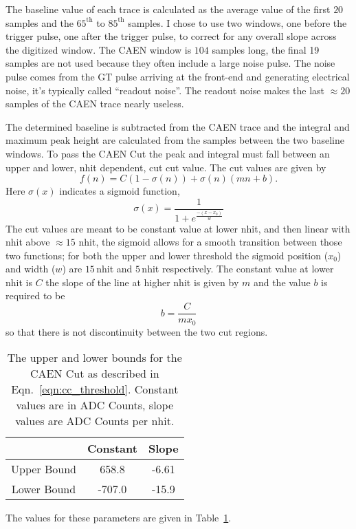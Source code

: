 The baseline value of each trace is calculated as the average value of the first
$20$ samples and the $65^{\text{th}}$ to $85^{\text{th}}$ samples.
I chose to use two windows, one before the trigger pulse, one after the trigger pulse, to
correct for any overall slope across the digitized window.
The CAEN window is $104$ samples long, the final 19 samples are not used because they often
include a large noise pulse.
The noise pulse comes from the GT pulse arriving at the front-end and generating electrical noise,
it's typically called ``readout noise''.
The readout noise makes the last $\approx20$ samples of the CAEN trace nearly
useless.

The determined baseline is subtracted from the CAEN trace and the integral and maximum
peak height are calculated from the samples between the two baseline windows.
To pass the CAEN Cut the peak and integral must fall between an upper and lower, nhit dependent,
cut cut value.
The cut values are given by
\begin{equation}
    f(n) = C\left(1-\sigma(n)\right) + \sigma(n)\left(mn+b\right)\text{.}
    \label{eqn:cc_threshold}
\end{equation}
Here $\sigma(x)$ indicates a sigmoid function,
\begin{equation}
    \sigma(x) = \frac{1}{1+e^{\frac{-(x-x_{0})}{w}}}
\end{equation}
The cut values are meant to be constant value at lower nhit, and then
linear with nhit above $\approx15$ nhit, the sigmoid allows for a smooth
transition between those two functions; for both the upper and lower threshold
the sigmoid position ($x_{0}$) and width ($w$) are $15$\,nhit and $5$\,nhit respectively.
The constant value at lower nhit is $C$ the slope of the line at higher nhit
is given by $m$ and the value $b$ is required to be
\begin{equation}
    b = \frac{C}{mx_{0}}
\end{equation}
so that there is not discontinuity between the two cut regions.
\begin{table}
    \centering
  \begin{tabular}{c | c c}
      & Constant & Slope  \\
      \hline
      Upper Bound & 658.8 & -6.61\\
      Lower Bound & -707.0 & -15.9\\
    \end{tabular}
    \caption[CAEN Cut Values]{The upper and lower bounds for the CAEN Cut as
    described in Eqn.~\eqref{eqn:cc_threshold}.
    Constant values are in ADC Counts, slope values are ADC Counts per nhit.}
\label{tbl:caen_cut}
\end{table}
The values for these parameters are given in Table~\ref{tbl:caen_cut}.

